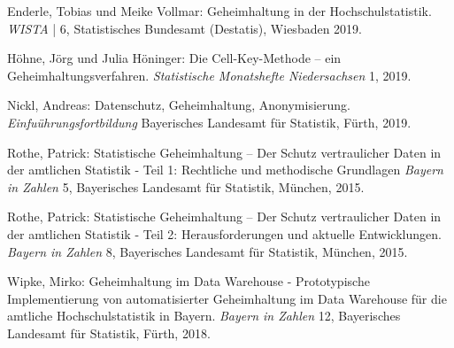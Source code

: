 

\begin{thebibliography}{9}
\singlespacing%

Enderle, Tobias und Meike Vollmar: Geheimhaltung in der Hochschulstatistik. \emph{WISTA} | 6, Statistisches Bundesamt (Destatis), Wiesbaden 2019.

Höhne, Jörg und Julia Höninger: Die Cell-Key-Methode – ein Geheimhaltungsverfahren. \emph{Statistische Monatshefte Niedersachsen} 1, 2019.

Nickl, Andreas: Datenschutz, Geheimhaltung, Anonymisierung. \emph{Einfuührungsfortbildung} Bayerisches Landesamt für Statistik, Fürth, 2019.

Rothe, Patrick: Statistische Geheimhaltung – Der Schutz vertraulicher Daten in der amtlichen Statistik - Teil 1: Rechtliche und methodische Grundlagen \emph{Bayern in Zahlen} 5, Bayerisches Landesamt für Statistik, München, 2015.

Rothe, Patrick: Statistische Geheimhaltung – Der Schutz vertraulicher Daten in der amtlichen Statistik - Teil 2: Herausforderungen und aktuelle Entwicklungen. \emph{Bayern in Zahlen} 8, Bayerisches Landesamt für Statistik, München, 2015.

Wipke, Mirko: Geheimhaltung im Data Warehouse - Prototypische Implementierung von automatisierter Geheimhaltung im Data Warehouse für die amtliche Hochschulstatistik in Bayern. \emph{Bayern in Zahlen} 12, Bayerisches Landesamt für Statistik, Fürth, 2018.





\end{thebibliography}%

\newpage%

